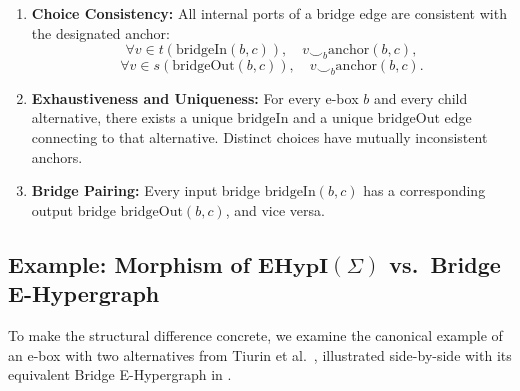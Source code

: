 \documentclass[11pt,a4paper]{article}
\theoremstyle{definition}
\theoremstyle{plain}
\begin{document}
\begin{enumerate}[label=\textbf{L\arabic*.}]
    \item \textbf{Choice Consistency:}
    All internal ports of a bridge edge are consistent with the designated anchor:
    \[
    \forall v \in t(\mathrm{bridgeIn}(b, c)), \quad v \smile_b \mathrm{anchor}(b, c),
    \]
    \[
    \forall v \in s(\mathrm{bridgeOut}(b, c)), \quad v \smile_b \mathrm{anchor}(b, c).
    \]

    \item \textbf{Exhaustiveness and Uniqueness:}
    For every e-box $b$ and every child alternative, there exists a unique $\mathrm{bridgeIn}$ and a unique $\mathrm{bridgeOut}$ edge connecting to that alternative. Distinct choices have mutually inconsistent anchors.

    \item \textbf{Bridge Pairing:}
    Every input bridge $\mathrm{bridgeIn}(b, c)$ has a corresponding output bridge $\mathrm{bridgeOut}(b, c)$, and vice versa.
\end{enumerate}

\subsection{Example: Morphism of $\mathbf{EHypI}(\Sigma)$ vs.\ Bridge E-Hypergraph}

To make the structural difference concrete, we examine the canonical example of an e-box with two alternatives from Tiurin et al.~\cite[Fig.~6]{tiurin2024equivalence}, illustrated side-by-side with its equivalent Bridge E-Hypergraph in .
\end{document}
